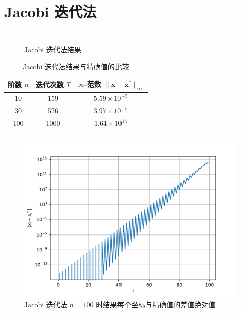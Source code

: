\documentclass{sjtuarticle}
\begin{document}
\clearpage

\section{Jacobi 迭代法}
\label{sec:jacobi}

\inputminted[firstline=158,lastline=183]{python3}{main.py}
\vspace*{-0.6cm}
\begin{minipage}{0.5\textwidth}
    \begin{figure}[H]
        \centering
        \inputminted[firstline=95,lastline=132,fontsize=\tiny]{text}{stdout.txt}
        \caption{Jacobi 迭代法结果}
    \end{figure}
\end{minipage}
\begin{minipage}{0.45\textwidth}
    \begin{table}[H]
        \centering
        \caption{Jacobi 迭代法结果与精确值的比较}
        \begin{tabular}{ccc}
            \toprule
            阶数 $n$ & 迭代次数 $T$ & $\infty$-范数 $\lVert \bm{x}-\bm{x}^* \rVert_\infty$ \\
            \midrule
            10 & 159   & $5.59\times 10^{-5}$ \\
            30 & 526   & $3.97\times 10^{-5}$ \\
            100 & 1000 & $1.64\times 10^{14}$\\
            \bottomrule
        \end{tabular}
    \end{table}
    \vspace*{-0.75cm}
    \begin{figure}[H]
        \centering
        \includegraphics[width=\textwidth]{pic/JacobiSolver.pdf}
        \caption{Jacobi 迭代法 $n=100$ 时结果每个坐标与精确值的差值绝对值}
    \end{figure}
\end{minipage}
\end{document}
